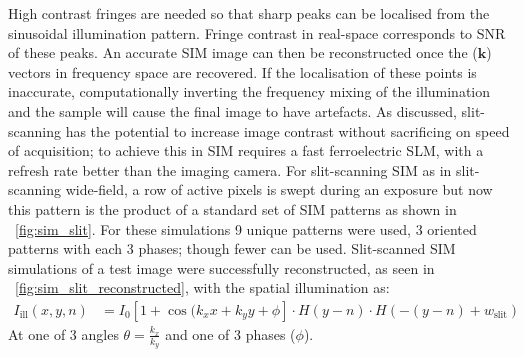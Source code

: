 High contrast fringes are needed so that sharp peaks can be localised from the sinusoidal illumination pattern.
Fringe contrast in real-space corresponds to \gls{SNR} of these peaks.
An accurate \gls{SIM} image can then be reconstructed once the (\(\mathbf{k}\)) vectors in frequency space are recovered.
If the localisation of these points is inaccurate, computationally inverting the frequency mixing of the illumination and the sample will cause the final image to have artefacts.
As discussed, \gls{slit-scanning} has the potential to increase image contrast without sacrificing on speed of acquisition; to achieve this in \gls{SIM} requires a fast ferroelectric \gls{SLM}, with a refresh rate better than the imaging camera.
For slit-scanning \gls{SIM} as in slit-scanning \gls{wide-field}, a row of active pixels is swept during an exposure but now this pattern is the product of a standard set of \gls{SIM} patterns as shown in \figurename~\ref{fig:sim_slit}.
For these simulations 9 unique patterns were used, 3 oriented patterns with each 3 phases; though fewer can be used\cite{strohlSpeedLimitsStructured2017}.
Slit-scanned \gls{SIM} simulations of a test image were successfully reconstructed, as seen in \figurename~\ref{fig:sim_slit_reconstructed}, with the spatial illumination as:
\begin{align}
    I_{\text{ill}}(x,y,n) &= {I_0} [1 + \cos(k_x x + k_y y + \phi] \cdot  H(y-n) \cdot H(-(y-n)+w_{\text{slit}})
\end{align}
At one of 3 angles \(\theta = \frac{k_x}{k_y}\) and one of 3 phases (\(\phi\)).
\clearpage
